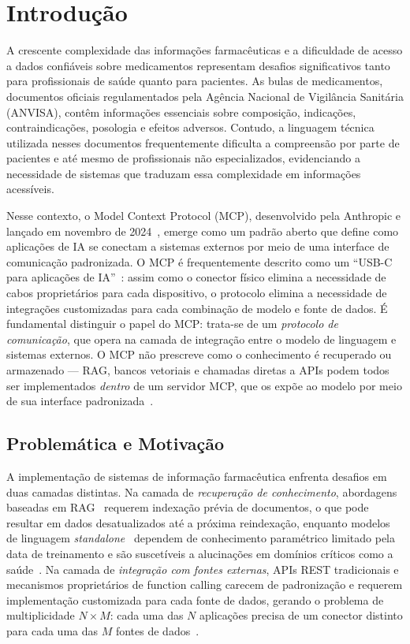 \documentclass[12pt]{article}
\begin{document}
\section{Introdução}

A crescente complexidade das informações farmacêuticas e a dificuldade de acesso a dados confiáveis sobre medicamentos representam desafios significativos tanto para profissionais de saúde quanto para pacientes. As bulas de medicamentos, documentos oficiais regulamentados pela Agência Nacional de Vigilância Sanitária (ANVISA), contêm informações essenciais sobre composição, indicações, contraindicações, posologia e efeitos adversos. Contudo, a linguagem técnica utilizada nesses documentos frequentemente dificulta a compreensão por parte de pacientes e até mesmo de profissionais não especializados, evidenciando a necessidade de sistemas que traduzam essa complexidade em informações acessíveis.

Nesse contexto, o Model Context Protocol (MCP), desenvolvido pela Anthropic e lançado em novembro de 2024~\cite{anthropic2024mcp}, emerge como um padrão aberto que define como aplicações de IA se conectam a sistemas externos por meio de uma interface de comunicação padronizada. O MCP é frequentemente descrito como um ``USB-C para aplicações de IA''~\cite{ibm2025mcp}: assim como o conector físico elimina a necessidade de cabos proprietários para cada dispositivo, o protocolo elimina a necessidade de integrações customizadas para cada combinação de modelo e fonte de dados. É fundamental distinguir o papel do MCP: trata-se de um \emph{protocolo de comunicação}, que opera na camada de integração entre o modelo de linguagem e sistemas externos. O MCP não prescreve como o conhecimento é recuperado ou armazenado --- RAG, bancos vetoriais e chamadas diretas a APIs podem todos ser implementados \emph{dentro} de um servidor MCP, que os expõe ao modelo por meio de sua interface padronizada~\cite{databricks2025mcp}.

\subsection{Problemática e Motivação}

A implementação de sistemas de informação farmacêutica enfrenta desafios em duas camadas distintas. Na camada de \emph{recuperação de conhecimento}, abordagens baseadas em RAG~\cite{gao2023rag} requerem indexação prévia de documentos, o que pode resultar em dados desatualizados até a próxima reindexação, enquanto modelos de linguagem \emph{standalone}~\cite{brown2020gpt3} dependem de conhecimento paramétrico limitado pela data de treinamento e são suscetíveis a alucinações em domínios críticos como a saúde~\cite{thirunavukarasu2023llm}. Na camada de \emph{integração com fontes externas}, APIs REST tradicionais e mecanismos proprietários de function calling carecem de padronização e requerem implementação customizada para cada fonte de dados, gerando o problema de multiplicidade $N \times M$: cada uma das $N$ aplicações precisa de um conector distinto para cada uma das $M$ fontes de dados~\cite{wikipedia2025mcp}.
\end{document}
